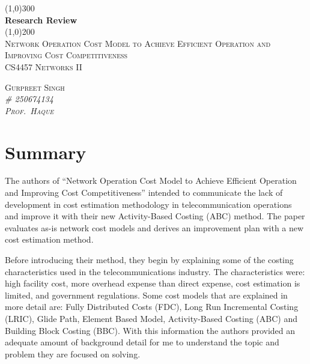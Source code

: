 \documentclass[10pt,]{article}
\begin{document}
\doublespacing

\begin{titlepage}
    \begin{center}
    \line(1,0){300} \\ 
    [0.25in]
    \huge{\bfseries Research Review} \\
    [2mm]
    \line(1,0){200} \\
    [1.5cm] 
    \textsc{\Large Network Operation Cost Model to Achieve Efficient Operation and
Improving Cost Competitiveness} \\
    [0.75cm]
    \textsc{\Large CS4457 Networks II} \\
    [9cm]
    \end{center}
    
    \begin{flushright}
    \textsc{\Large{Gurpreet Singh \\}\normalsize\emph{\# 250674134 \\}\normalsize\emph{Prof.~Haque \\} }
    
    \end{flushright}
    
\end{titlepage}

\newpage

\section{Summary}\label{summary}

The authors of ``Network Operation Cost Model to Achieve Efficient
Operation and Improving Cost Competitiveness'' intended to communicate
the lack of development in cost estimation methodology in
telecommunication operations and improve it with their new
Activity-Based Costing (ABC) method. The paper evaluates as-is network
cost models and derives an improvement plan with a new cost estimation
method.

Before introducing their method, they begin by explaining some of the
costing characteristics used in the telecommunications industry. The
characteristics were: high facility cost, more overhead expense than
direct expense, cost estimation is limited, and government regulations.
Some cost models that are explained in more detail are: Fully
Distributed Costs (FDC), Long Run Incremental Costing (LRIC), Glide
Path, Element Based Model, Activity-Based Costing (ABC) and Building
Block Costing (BBC). With this information the authors provided an
adequate amount of background detail for me to understand the topic and
problem they are focused on solving.
\end{document}
